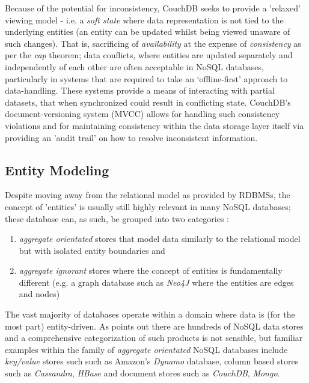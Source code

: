 Because of the potential for inconsistency, CouchDB seeks to provide a 'relaxed' viewing model - i.e. a \textit{soft state} where data representation is not tied to the underlying entities (an entity can be updated whilst being viewed unaware of such changes). That is, sacrificing of \textit{availability} at the expense of \textit{consistency} as per the \textit{cap} theorem; data conflicts, where entities are updated separately and independently of each other are often acceptable in NoSQL databases, particularly in systems that are required to take an `offline-first' approach to data-handling. These systems provide a means of interacting with partial datasets, that when synchronized could result in conflicting state. CouchDB's document-versioning system (MVCC) allows for handling such consistency violations and for maintaining consistency within the data storage layer itself via providing an 'audit trail' on how to resolve inconsistent information.

\subsection{Entity Modeling}
Despite moving away from the relational model as provided by RDBMSs, the concept of 'entities' is usually still highly relevant in many NoSQL databases; these database can, as such, be grouped into two categories \cite{fowlerAggregate}:

\begin{enumerate}
    \item \textit{aggregate orientated} stores that model data similarly to the relational model but with isolated entity boundaries and
    \item \textit{aggregate ignorant} stores where the concept of entities is fundamentally different (e.g. a graph database such as \textit{Neo4J} where the entities are edges and nodes)
\end{enumerate}

The vast majority of databases operate within a domain where data is (for the most part) entity-driven. As \cite{GANESHCHANDRA201513} points out there are hundreds of NoSQL data stores and a comprehensive categorization of such products is not sensible, but familiar examples within the family of \textit{aggregate orientated} NoSQL databases include \textit{key/value} stores such such as Amazon's \textit{Dynamo} database, column based stores such as \textit{Cassandra}, \textit{HBase} and document stores such as \textit{CouchDB}, \textit{Mongo}.

